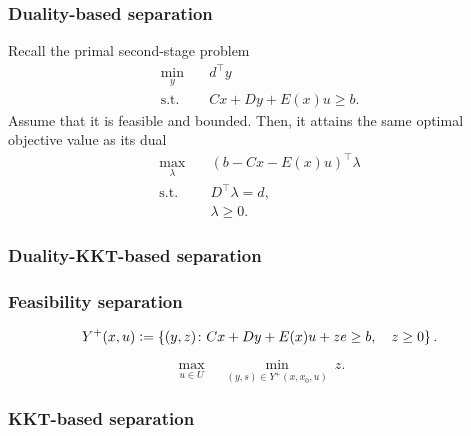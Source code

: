 \subsubsection*{Duality-based separation}

Recall the primal second-stage problem
\begin{subequations}
    \begin{align*}
        \min_{y} \quad & d^\top y \\
        \text{s.t.} \quad & Cx + Dy + E(x)u \ge b.
    \end{align*}
\end{subequations}
Assume that it is feasible and bounded. Then, it attains the same optimal
objective value as its dual
\begin{subequations}
    \begin{align*}
        \max_{\lambda} \quad & (b - Cx - E(x)u)^\top\lambda \\
        \text{s.t.} \quad & D^\top \lambda = d, \\
        & \lambda \ge 0.
    \end{align*}
\end{subequations}

\subsubsection*{Duality-KKT-based separation}


\subsubsection{Feasibility separation}



\begin{equation*}
    Y^{+}(x,u) \mathrel{{\mathop:}{=}} 
    \left\{
        (y,z)
    \colon
        Cx + Dy + E(x)u + ze \ge b, \quad
        z \ge 0
    \right\}.
\end{equation*}

\begin{equation*}
    \max_{u\in U} \quad \min_{(y,s)\in Y^{+}(x,x_0,u)} \ z.
\end{equation*}


\subsubsection*{KKT-based separation}

